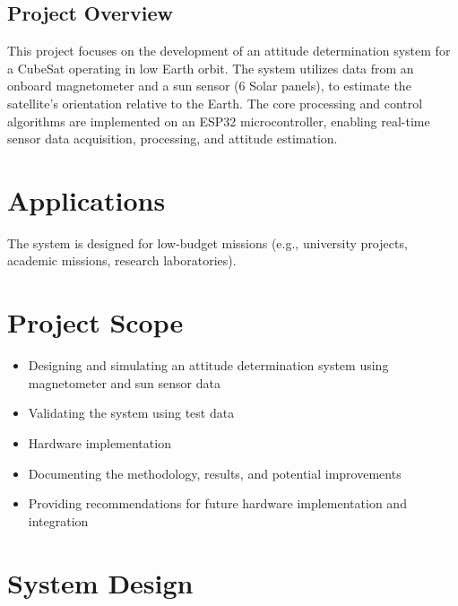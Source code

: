 \documentclass[a4paper, 12pt]{article}
\begin{document}
\subsection{Project Overview}
This project focuses on the development of an attitude determination system for a CubeSat operating in low Earth orbit. The system utilizes data from an onboard magnetometer and a sun sensor (6 Solar panels), to estimate the satellite’s orientation relative to the Earth. The core processing and control algorithms are implemented on an ESP32 microcontroller, enabling real-time sensor data acquisition, processing, and attitude estimation.

\section{Applications}
The system is designed for low-budget missions (e.g., university projects, academic missions, research laboratories).

\section{Project Scope}
\begin{itemize}
    \item Designing and simulating an attitude determination system using magnetometer and sun sensor data
    \item Validating the system using test data
    \item Hardware implementation
    \item Documenting the methodology, results, and potential improvements
    \item Providing recommendations for future hardware implementation and integration
\end{itemize}

\newpage
\section{System Design}
\end{document}
